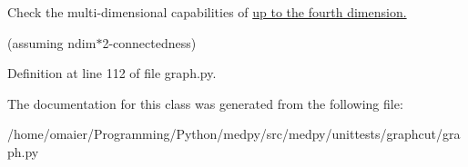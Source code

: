 Check the multi-\/dimensional capabilities of \hyperlink{}{up to the fourth dimension. }

(assuming ndim$\ast$2-\/connectedness) 

Definition at line 112 of file graph.py.



The documentation for this class was generated from the following file:\begin{DoxyCompactItemize}
\item 
/home/omaier/Programming/Python/medpy/src/medpy/unittests/graphcut/graph.py\end{DoxyCompactItemize}
